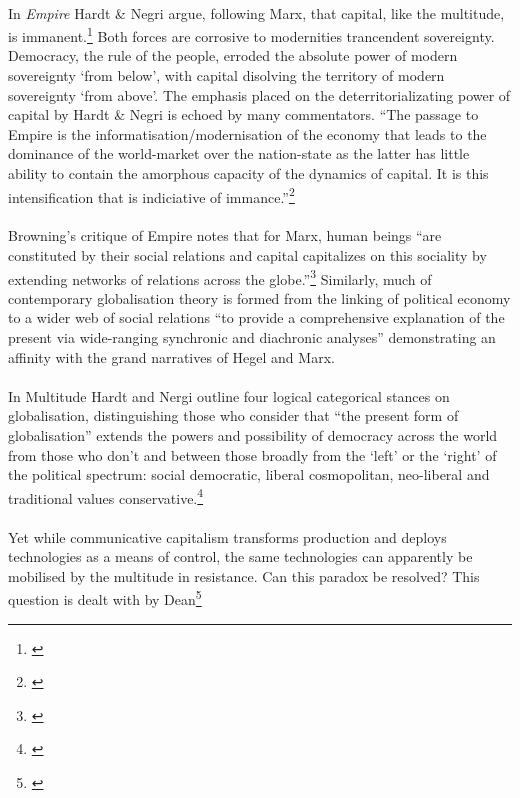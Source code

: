 \paragraph{}In \textit{Empire} Hardt \& Negri argue, following Marx, that capital, like the multitude, is immanent.\footnote{\cite[p. 326]{Hardt:2001jl}} Both forces are corrosive to modernities trancendent sovereignty. Democracy, the rule of the people, erroded the absolute power of modern sovereignty `from below', with capital disolving the territory of modern sovereignty `from above'. The emphasis placed on the deterritorializating power of capital by Hardt \& Negri is echoed by many commentators. ``The passage to Empire is the informatisation/modernisation of the economy that leads to the dominance of the world-market over the nation-state as the latter has little ability to contain the amorphous capacity of the dynamics of capital. It is this intensification that is indiciative of immance.''\footnote{\cite[p. 632]{alhluwalia:2004ei}}

\paragraph{}Browning's critique of Empire notes that for Marx, human beings ``are constituted by their social relations and capital capitalizes on this sociality by extending networks of relations across the globe.''\footnote{\cite[p. 196]{browning:2005gi}} Similarly, much of contemporary globalisation theory is formed from the linking of political economy to a wider web of social relations ``to provide a comprehensive explanation of the present via wide-ranging synchronic and diachronic analyses'' demonstrating an affinity with the grand narratives of Hegel and Marx.

\paragraph{}In Multitude Hardt and Nergi outline four logical categorical stances on globalisation, distinguishing those who consider that ``the present form of globalisation'' extends the powers and possibility of democracy across the world from those who don't and between those broadly from the `left' or the `right' of the political spectrum: social democratic, liberal cosmopolitan, neo-liberal and traditional values conservative.\footnote{\cite[p. 232-236]{Hardt:2005zt}}

\paragraph{}Yet while communicative capitalism transforms production and deploys technologies as a means of control, the same technologies can apparently be mobilised by the multitude in resistance. Can this paradox be resolved? This question is dealt with by Dean\footnote{\cite{dean:2005cc}}


